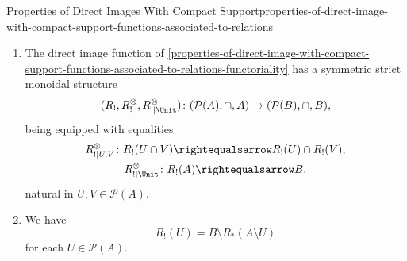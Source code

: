 \begin{proposition}{Properties of Direct Images With Compact Support}{properties-of-direct-image-with-compact-support-functions-associated-to-relations}
\begin{enumerate}
            \[
                \begin{gathered}
                    R^{\otimes}_{!|U,V}   \colon R_{!}(U)\cup R_{!}(V) \subset R_{!}(U\cup V),\\
                    R^{\otimes}_{!|\Unit} \colon \emptyset               \subset R_{!}(\emptyset),
                \end{gathered}
            \]%
            natural in $U,V\in\mathcal{P}(A)$.
        \item\label{properties-of-direct-image-with-compact-support-functions-associated-to-relations-symmetric-strict-monoidality-with-respect-to-intersections}The direct image function of \cref{properties-of-direct-image-with-compact-support-functions-associated-to-relations-functoriality} has a symmetric strict monoidal structure
            \[
                (R_{!},R^{\otimes}_{!},R^{\otimes}_{!|\Unit})
                \colon
                (\mathcal{P}(A),\cap,A)
                \to
                (\mathcal{P}(B),\cap,B),
            \]%
            being equipped with equalities%
            \[
                \begin{gathered}
                    R^{\otimes}_{!|U,V}   \colon R_{!}(U\cap V) \rightequalsarrow R_{!}(U)\cap R_{!}(V),\\
                    R^{\otimes}_{!|\Unit} \colon R_{!}(A)       \rightequalsarrow B,
                \end{gathered}
            \]%
            natural in $U,V\in\mathcal{P}(A)$.
        \item\label{properties-of-direct-image-with-compact-support-functions-associated-to-relations-relation-to-direct-images}We have
            \[
                R_{!}(U)%
                =%
                B\setminus R_{*}(A\setminus U)
            \]%
            for each $U\in\mathcal{P}(A)$.
    \end{enumerate}
\end{proposition}
